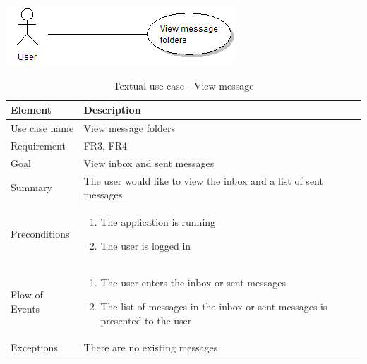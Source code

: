 \begin{table}
\begin{center}
\begin{center}
\includegraphics[width=\textwidth]{view_message_folders}
\end{center}
\begin{tabular}{p{3cm}|p{12cm}} \hline
\textbf{Element} & \textbf{Description} \\ \hline \hline
Use case name & View message folders \\ 
Requirement & FR3, FR4 \\
Goal & View inbox and sent messages \\ 
Summary &The user would like to view the inbox and a list of sent messages \\ \hline
Preconditions &
\begin{enumerate}
\item{}The application is running
\item{}The user is logged in
\end{enumerate} \\ \hline
Flow of Events &
\begin{enumerate}
\item{}The user enters the inbox or sent messages
\item{}The list of messages in the inbox or sent messages is presented to the user
\end{enumerate} \\ \hline
Exceptions & There are no existing messages\\ \hline
\end{tabular}
\end{center}
\caption{Textual use case - View message} \label{tab:viewmessagefolders}
\end{table}

